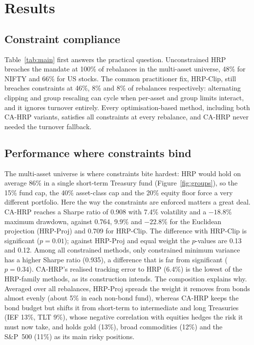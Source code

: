 \FloatBarrier
\section{Results}\label{sec:results}



\subsection{Constraint compliance}
Table~\ref{tab:main} first answers the practical question. Unconstrained HRP breaches the
mandate at 100\% of rebalances in the multi-asset universe, 48\% for NIFTY and 66\% for
US stocks. The common practitioner fix, HRP-Clip, still breaches constraints at 46\%, 8\%
and 8\% of rebalances respectively: alternating clipping and group rescaling can cycle
when per-asset and group limits interact, and it ignores turnover entirely. Every
optimisation-based method, including both CA-HRP variants, satisfies all constraints at
every rebalance, and CA-HRP never needed the turnover fallback.

\subsection{Performance where constraints bind}
The multi-asset universe is where constraints bite hardest: HRP would hold on average 86\%
in a single short-term Treasury fund (Figure~\ref{fig:groups}), so the 15\% fund cap, the
40\% asset-class cap and the 20\% equity floor force a very different portfolio. Here the
way the constraints are enforced matters a great deal. CA-HRP reaches a Sharpe ratio of
0.908 with 7.4\% volatility and a $-18.8\%$ maximum drawdown, against 0.764, 9.9\% and
$-22.8\%$ for the Euclidean projection (HRP-Proj) and 0.709 for HRP-Clip. The difference with
HRP-Clip is significant ($p=0.01$); against HRP-Proj and equal weight the $p$-values are
0.13 and 0.12. Among all constrained methods, only constrained minimum variance has a higher
Sharpe ratio (0.935), a difference that is far from significant ($p=0.34$). CA-HRP's
realised tracking error to HRP (6.4\%) is the lowest of the HRP-family methods, as its
construction intends. The composition explains why. Averaged over all rebalances,
HRP-Proj spreads the weight it removes from bonds almost evenly (about 5\% in each
non-bond fund), whereas CA-HRP keeps the bond budget but shifts it from short-term to
intermediate and long Treasuries (IEF 13\%, TLT 9\%), whose negative correlation with
equities hedges the risk it must now take, and holds gold (13\%), broad commodities
(12\%) and the S\&P~500 (11\%) as its main risky positions.

